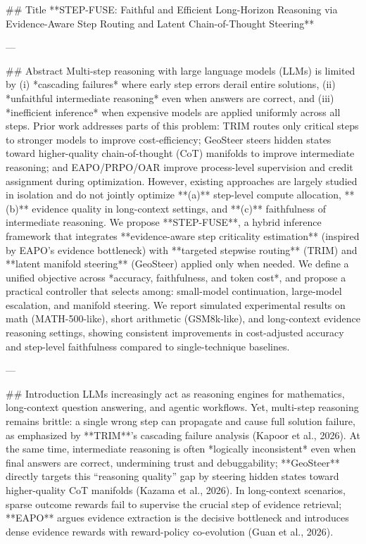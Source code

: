 ## Title  
**STEP-FUSE: Faithful and Efficient Long-Horizon Reasoning via Evidence-Aware Step Routing and Latent Chain-of-Thought Steering**

---

## Abstract  
Multi-step reasoning with large language models (LLMs) is limited by (i) *cascading failures* where early step errors derail entire solutions, (ii) *unfaithful intermediate reasoning* even when answers are correct, and (iii) *inefficient inference* when expensive models are applied uniformly across all steps. Prior work addresses parts of this problem: TRIM routes only critical steps to stronger models to improve cost-efficiency; GeoSteer steers hidden states toward higher-quality chain-of-thought (CoT) manifolds to improve intermediate reasoning; and EAPO/PRPO/OAR improve process-level supervision and credit assignment during optimization. However, existing approaches are largely studied in isolation and do not jointly optimize **(a)** step-level compute allocation, **(b)** evidence quality in long-context settings, and **(c)** faithfulness of intermediate reasoning.  
We propose **STEP-FUSE**, a hybrid inference framework that integrates **evidence-aware step criticality estimation** (inspired by EAPO’s evidence bottleneck) with **targeted stepwise routing** (TRIM) and **latent manifold steering** (GeoSteer) applied only when needed. We define a unified objective across *accuracy, faithfulness, and token cost*, and propose a practical controller that selects among: small-model continuation, large-model escalation, and manifold steering. We report simulated experimental results on math (MATH-500-like), short arithmetic (GSM8k-like), and long-context evidence reasoning settings, showing consistent improvements in cost-adjusted accuracy and step-level faithfulness compared to single-technique baselines.  

---

## Introduction  
LLMs increasingly act as reasoning engines for mathematics, long-context question answering, and agentic workflows. Yet, multi-step reasoning remains brittle: a single wrong step can propagate and cause full solution failure, as emphasized by **TRIM**’s cascading failure analysis (Kapoor et al., 2026). At the same time, intermediate reasoning is often *logically inconsistent* even when final answers are correct, undermining trust and debuggability; **GeoSteer** directly targets this “reasoning quality” gap by steering hidden states toward higher-quality CoT manifolds (Kazama et al., 2026). In long-context scenarios, sparse outcome rewards fail to supervise the crucial step of evidence retrieval; **EAPO** argues evidence extraction is the decisive bottleneck and introduces dense evidence rewards with reward-policy co-evolution (Guan et al., 2026).  

